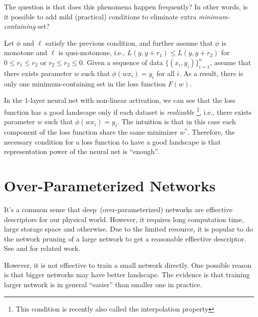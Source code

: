 The question is that does this phenomena happen frequently? In other words, is it possible to add mild (practical) conditions to eliminate extra \emph{minimum-containing} set?

\begin{theorem}
Let $\phi$ and $\ell$ satisfy the previous condition, and further assume that $\phi$ is monotone and $\ell$ is qusi-motonone, i.e., $L(y,y+r_1)\le L(y,y+r_2)$ for $0\le r_1\le r_2$ or $r_2\le r_2\le0$.
Given a sequence of data $\{(x_i,y_i)\}_{i=1}^n$, assume that there exists parameter $w$ such that $\phi(wx_i)=y_i$ for all $i$. As a result, there is only one minimum-containing set in the loss function $F(w)$.
\end{theorem}

\begin{remark}
In the $1$-layer neural net with non-linear activation, we can see that the loss function has a good landscape only if each dataset is \emph{realizable}
\footnote{This condition is recently also called the interpolation property}, i.e., there exists parameter $w$ such that $\phi(wx_i)=y_i$.
The intuition is that in this case each component of the loss function share the same minimizer $w^*$. 
Therefore, the necessary condition for a loss function to have a good landscape is that representation power of the neural net is ``enough''.
\end{remark}


\section{Over-Parameterized Networks}
It's a common sense that deep~(over-parameterized) networks are effiective descriptors for our physical world.
However, it requires long computation time, large storage space and otherwise.
Due to the limited resource, it is popular to do the network pruning of a large network to get a reasonable effiective descriptor.
See \citep{frankle2018the} and \citep{NIPS2015_5784} for related work.
\begin{center}
\end{center}
However, it is not effiective to train a small network directly.
One possible reason is that bigger networks may have better landscape.
The evidence is that training larger network is in general ``easier'' than smaller one in practice.

